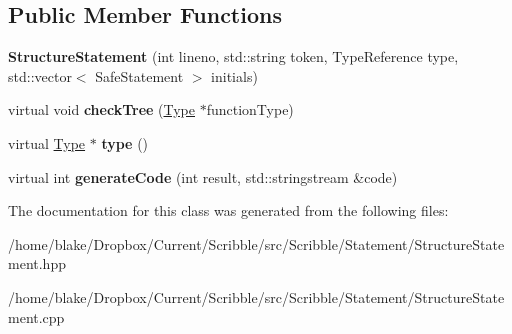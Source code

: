 \subsection*{Public Member Functions}
\begin{DoxyCompactItemize}
\item 
\hypertarget{class_scribble_core_1_1_structure_statement_af3b9e2c10dfa00ff877b0478a6b59b3b}{{\bfseries Structure\-Statement} (int lineno, std\-::string token, Type\-Reference type, std\-::vector$<$ Safe\-Statement $>$ initials)}\label{class_scribble_core_1_1_structure_statement_af3b9e2c10dfa00ff877b0478a6b59b3b}

\item 
\hypertarget{class_scribble_core_1_1_structure_statement_ae0d146e460d4e98800ff3d676bd9d53e}{virtual void {\bfseries check\-Tree} (\hyperlink{class_scribble_core_1_1_type}{Type} $\ast$function\-Type)}\label{class_scribble_core_1_1_structure_statement_ae0d146e460d4e98800ff3d676bd9d53e}

\item 
\hypertarget{class_scribble_core_1_1_structure_statement_af079e625c1bfe690339c0b4922dd152c}{virtual \hyperlink{class_scribble_core_1_1_type}{Type} $\ast$ {\bfseries type} ()}\label{class_scribble_core_1_1_structure_statement_af079e625c1bfe690339c0b4922dd152c}

\item 
\hypertarget{class_scribble_core_1_1_structure_statement_a55d89fd9d10c1f5885da232a435014ab}{virtual int {\bfseries generate\-Code} (int result, std\-::stringstream \&code)}\label{class_scribble_core_1_1_structure_statement_a55d89fd9d10c1f5885da232a435014ab}

\end{DoxyCompactItemize}


The documentation for this class was generated from the following files\-:\begin{DoxyCompactItemize}
\item 
/home/blake/\-Dropbox/\-Current/\-Scribble/src/\-Scribble/\-Statement/Structure\-Statement.\-hpp\item 
/home/blake/\-Dropbox/\-Current/\-Scribble/src/\-Scribble/\-Statement/Structure\-Statement.\-cpp\end{DoxyCompactItemize}
